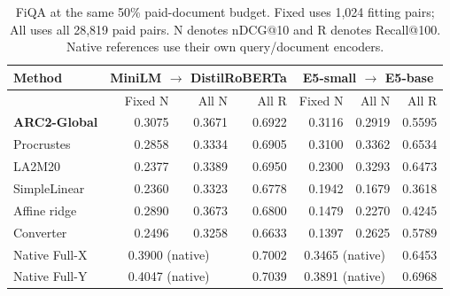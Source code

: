 \begin{table}[t]
\centering
\small
\setlength{\tabcolsep}{4pt}
\caption{FiQA at the same 50\% paid-document budget. Fixed uses 1,024 fitting pairs; All uses all 28,819 paid pairs. N denotes nDCG@10 and R denotes Recall@100. Native references use their own query/document encoders.}\label{tab:allpaid}
\begin{tabular}{lrrrrrr}
\toprule
Method & \multicolumn{3}{c}{MiniLM $\rightarrow$ DistilRoBERTa} & \multicolumn{3}{c}{E5-small $\rightarrow$ E5-base} \\
\midrule
 & Fixed N & All N & All R & Fixed N & All N & All R \\
\textbf{ARC2-Global} & 0.3075 & 0.3671 & 0.6922 & 0.3116 & 0.2919 & 0.5595 \\
Procrustes & 0.2858 & 0.3334 & 0.6905 & 0.3100 & 0.3362 & 0.6534 \\
LA2M20 & 0.2377 & 0.3389 & 0.6950 & 0.2300 & 0.3293 & 0.6473 \\
SimpleLinear & 0.2360 & 0.3323 & 0.6778 & 0.1942 & 0.1679 & 0.3618 \\
Affine ridge & 0.2890 & 0.3673 & 0.6800 & 0.1479 & 0.2270 & 0.4245 \\
Converter & 0.2496 & 0.3258 & 0.6633 & 0.1397 & 0.2625 & 0.5789 \\
Native Full-X & \multicolumn{2}{c}{0.3900 (native)} & 0.7002 & \multicolumn{2}{c}{0.3465 (native)} & 0.6453 \\
Native Full-Y & \multicolumn{2}{c}{0.4047 (native)} & 0.7039 & \multicolumn{2}{c}{0.3891 (native)} & 0.6968 \\
\bottomrule
\end{tabular}
\end{table}
